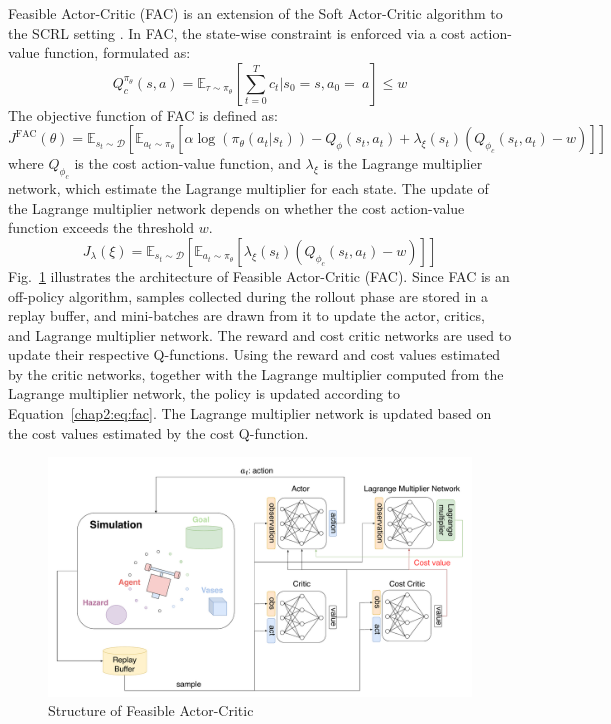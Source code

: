 Feasible Actor-Critic (FAC) is an extension of the Soft Actor-Critic algorithm to the SCRL setting \cite{FAC}.
In FAC, the state-wise constraint is enforced via a cost action-value function, formulated as:
\begin{equation}
  Q^{\pi_\theta}_c(s, a) = \mathbb{E}_{\tau \sim \pi_\theta}\left[\sum^T_{t = 0} c_t |s_0 = s, a_0 = ~a \right] \leq w
\end{equation}
The objective function of FAC is defined as:
\begin{equation} \label{chap2:eq:fac}
  J^{\text{FAC}}(\theta) = \mathbb{E}_{s_t \sim \mathcal{D}} \left[ \mathbb{E}_{a_t \sim \pi_\theta} [\alpha \log(\pi_\theta(a_t|s_t)) - Q_\phi(s_t, a_t) + \lambda_\xi(s_t)\left( Q_{\phi_c}(s_t, a_t) - w \right) ] \right]
\end{equation}
where $Q_{\phi_c}$ is the cost action-value function, and $\lambda_\xi$ is the Lagrange multiplier network, which estimate the Lagrange multiplier for each state.
The update of the Lagrange multiplier network depends on whether the cost action-value function exceeds the threshold $w$.
\begin{equation}
  J_\lambda(\xi) = \mathbb{E}_{s_t \sim \mathcal{D}} \left[ \mathbb{E}_{a_t \sim \pi_\theta} \left[ \lambda_\xi(s_t) \left( Q_{\phi_c}(s_t, a_t) - w \right) \right] \right]
\end{equation}
Fig.~\ref{chap2:fig:fac} illustrates the architecture of Feasible Actor-Critic (FAC). 
Since FAC is an off-policy algorithm, samples collected during the rollout phase are stored in a replay buffer, and mini-batches are drawn from it to update the actor, critics, and Lagrange multiplier network. 
The reward and cost critic networks are used to update their respective Q-functions.
Using the reward and cost values estimated by the critic networks, together with the Lagrange multiplier computed from the Lagrange multiplier network, the policy is updated according to Equation~\ref{chap2:eq:fac}. 
The Lagrange multiplier network is updated based on the cost values estimated by the cost Q-function.
\begin{figure}[t]
  \centering
  \includegraphics[width=1.0\textwidth]{imgs/chap2/fac.pdf}
  \caption{Structure of Feasible Actor-Critic}
  \label{chap2:fig:fac}
\end{figure}
